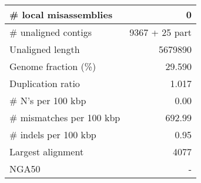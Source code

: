 \documentclass[12pt,a4paper]{article}
\begin{document}
\begin{table}[ht]
\begin{center}
\begin{tabular}{|l*{1}{|r}|}
\# local misassemblies & 0 \\ \hline
\# unaligned contigs & 9367 + 25 part \\ \hline
Unaligned length & 5679890 \\ \hline
Genome fraction (\%) & 29.590 \\ \hline
Duplication ratio & 1.017 \\ \hline
\# N's per 100 kbp & 0.00 \\ \hline
\# mismatches per 100 kbp & 692.99 \\ \hline
\# indels per 100 kbp & 0.95 \\ \hline
Largest alignment & 4077 \\ \hline
NGA50 & - \\ \hline
\end{tabular}
\end{center}
\end{table}
\end{document}
